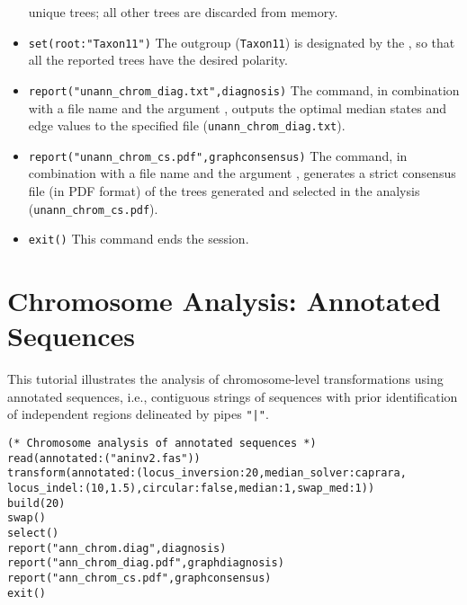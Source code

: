 \begin{itemize}
unique trees; all other trees are discarded from memory. 
\item \texttt{set(root:"Taxon11")} The outgroup (\texttt{Taxon11}) is designated by the , so that all the 
reported trees have the desired polarity.
\item \texttt{report("unann\_chrom\_diag.txt",diagnosis)}  The  command, in combination with a file name and the argument
, outputs the optimal median states and edge values to the specified file (\texttt{unann\_chrom\_diag.txt}). 
\item \texttt{report("unann\_chrom\_cs.pdf",graphconsensus)}  The  command, in combination with a file 
name and the argument , generates a strict consensus file (in PDF format) of the trees generated 
and selected in the analysis (\texttt{unann\_chrom\_cs.pdf}). 
\item \texttt{exit()} This command ends the \poy session.
\end{itemize}


\section{Chromosome Analysis: Annotated Sequences}{\label{tutorial9}}

This tutorial illustrates the analysis of chromosome-level transformations using 
annotated sequences, i.e., contiguous strings of sequences with prior 
identification of independent regions delineated by pipes  \texttt{"|"}. 

\begin{verbatim}
(* Chromosome analysis of annotated sequences *)
read(annotated:("aninv2.fas"))
transform(annotated:(locus_inversion:20,median_solver:caprara,
locus_indel:(10,1.5),circular:false,median:1,swap_med:1))
build(20)
swap()
select()
report("ann_chrom.diag",diagnosis)
report("ann_chrom_diag.pdf",graphdiagnosis)
report("ann_chrom_cs.pdf",graphconsensus)
exit()
\end{verbatim}

